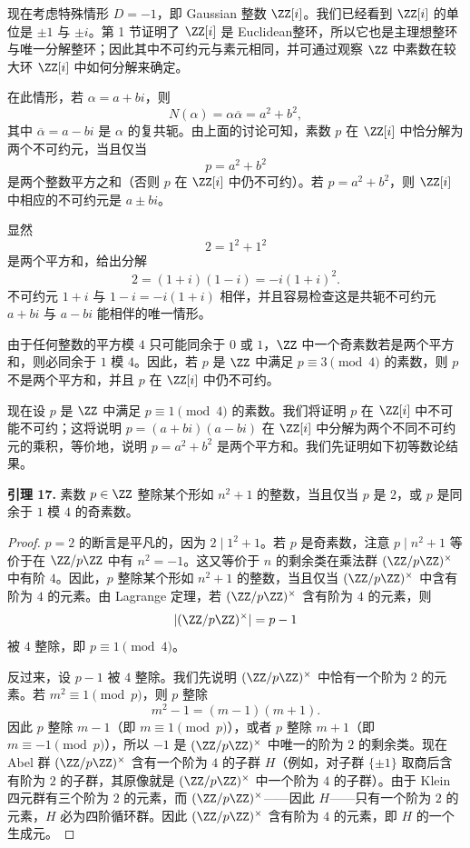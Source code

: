 现在考虑特殊情形 $D=-1$，即 Gaussian 整数 $\ZZ[i]$。我们已经看到 $\ZZ[i]$ 的单位是 $\pm1$ 与 $\pm i$。第 1 节证明了 $\ZZ[i]$ 是 Euclidean整环，所以它也是主理想整环与唯一分解整环；因此其中不可约元与素元相同，并可通过观察 $\ZZ$ 中素数在较大环 $\ZZ[i]$ 中如何分解来确定。

在此情形，若 $\alpha=a+bi$，则
\[
N(\alpha)=\alpha\overline\alpha=a^2+b^2,
\]
其中 $\overline\alpha=a-bi$ 是 $\alpha$ 的复共轭。由上面的讨论可知，素数 $p$ 在 $\ZZ[i]$ 中恰分解为两个不可约元，当且仅当
\[
p=a^2+b^2
\]
是两个整数平方之和（否则 $p$ 在 $\ZZ[i]$ 中仍不可约）。若 $p=a^2+b^2$，则 $\ZZ[i]$ 中相应的不可约元是 $a\pm bi$。

显然
\[
2=1^2+1^2
\]
是两个平方和，给出分解
\[
2=(1+i)(1-i)=-i(1+i)^2.
\]
不可约元 $1+i$ 与 $1-i=-i(1+i)$ 相伴，并且容易检查这是共轭不可约元 $a+bi$ 与 $a-bi$ 能相伴的唯一情形。

由于任何整数的平方模 $4$ 只可能同余于 $0$ 或 $1$，$\ZZ$ 中一个奇素数若是两个平方和，则必同余于 $1$ 模 $4$。因此，若 $p$ 是 $\ZZ$ 中满足 $p\equiv3\pmod4$ 的素数，则 $p$ 不是两个平方和，并且 $p$ 在 $\ZZ[i]$ 中仍不可约。

现在设 $p$ 是 $\ZZ$ 中满足 $p\equiv1\pmod4$ 的素数。我们将证明 $p$ 在 $\ZZ[i]$ 中不可能不可约；这将说明 $p=(a+bi)(a-bi)$ 在 $\ZZ[i]$ 中分解为两个不同不可约元的乘积，等价地，说明 $p=a^2+b^2$ 是两个平方和。我们先证明如下初等数论结果。

\medskip
\noindent\textbf{引理 17.}
素数 $p\in\ZZ$ 整除某个形如 $n^2+1$ 的整数，当且仅当 $p$ 是 $2$，或 $p$ 是同余于 $1$ 模 $4$ 的奇素数。

\begin{proof}
	$p=2$ 的断言是平凡的，因为 $2\mid 1^2+1$。若 $p$ 是奇素数，注意 $p\mid n^2+1$ 等价于在 $\ZZ/p\ZZ$ 中有 $n^2=-1$。这又等价于 $n$ 的剩余类在乘法群 $(\ZZ/p\ZZ)^\times$ 中有阶 $4$。因此，$p$ 整除某个形如 $n^2+1$ 的整数，当且仅当 $(\ZZ/p\ZZ)^\times$ 中含有阶为 $4$ 的元素。由 Lagrange 定理，若 $(\ZZ/p\ZZ)^\times$ 含有阶为 $4$ 的元素，则
	\[
	|(\ZZ/p\ZZ)^\times|=p-1
	\]
	被 $4$ 整除，即 $p\equiv1\pmod4$。
	
	反过来，设 $p-1$ 被 $4$ 整除。我们先说明 $(\ZZ/p\ZZ)^\times$ 中恰有一个阶为 $2$ 的元素。若 $m^2\equiv1\pmod p$，则 $p$ 整除
	\[
	m^2-1=(m-1)(m+1).
	\]
	因此 $p$ 整除 $m-1$（即 $m\equiv1\pmod p$），或者 $p$ 整除 $m+1$（即 $m\equiv-1\pmod p$），所以 $-1$ 是 $(\ZZ/p\ZZ)^\times$ 中唯一的阶为 $2$ 的剩余类。现在 Abel 群 $(\ZZ/p\ZZ)^\times$ 含有一个阶为 $4$ 的子群 $H$（例如，对子群 $\{\pm1\}$ 取商后含有阶为 $2$ 的子群，其原像就是 $(\ZZ/p\ZZ)^\times$ 中一个阶为 $4$ 的子群）。由于 Klein 四元群有三个阶为 $2$ 的元素，而 $(\ZZ/p\ZZ)^\times$——因此 $H$——只有一个阶为 $2$ 的元素，$H$ 必为四阶循环群。因此 $(\ZZ/p\ZZ)^\times$ 含有阶为 $4$ 的元素，即 $H$ 的一个生成元。
\end{proof}

